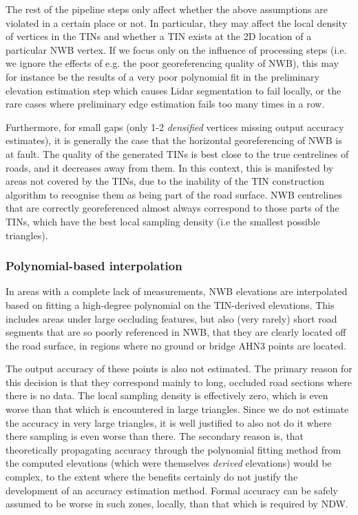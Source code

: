 The rest of the pipeline steps only affect whether the above assumptions are violated in a certain place or not. In particular, they may affect the local density of vertices in the TINs and whether a TIN exists at the 2D location of a particular NWB vertex. If we focus only on the influence of processing steps (i.e. we ignore the effects of e.g. the poor georeferencing quality of NWB), this may for instance be the results of a very poor polynomial fit in the preliminary elevation estimation step which causes Lidar segmentation to fail locally, or the rare cases where preliminary edge estimation fails too many times in a row. 

Furthermore, for small gaps (only 1-2 \textit{densified} vertices missing output accuracy estimates), it is generally the case that the horizontal georeferencing of NWB is at fault. The quality of the generated TINs is best close to the true centrelines of roads, and it decreases away from them. In this context, this is manifested by areas not covered by the TINs, due to the inability of the TIN construction algorithm to recognise them as being part of the road surface. NWB centrelines that are correctly georeferenced almost always correspond to those parts of the TINs, which have the best local sampling density (i.e the smallest possible triangles).

\subsubsection{Polynomial-based interpolation}

In areas with a complete lack of measurements, NWB elevations are interpolated based on fitting a high-degree polynomial on the TIN-derived elevations. This includes areas under large occluding features, but also (very rarely) short road segments that are so poorly referenced in NWB, that they are clearly located off the road surface, in regions where no ground or bridge AHN3 points are located.

The output accuracy of these points is also not estimated. The primary reason for this decision is that they correspond mainly to long, occluded road sections where there is no data. The local sampling density is effectively zero, which is even worse than that which is encountered in large triangles. Since we do not estimate the accuracy in very large triangles, it is well justified to also not do it where there sampling is even worse than there. The secondary reason is, that theoretically propagating accuracy through the polynomial fitting method from the computed elevations (which were themselves \textit{derived} elevations) would be complex, to the extent where the benefits certainly do not justify the development of an accuracy estimation method. Formal accuracy can be safely assumed to be worse in such zones, locally, than that which is required by NDW.

